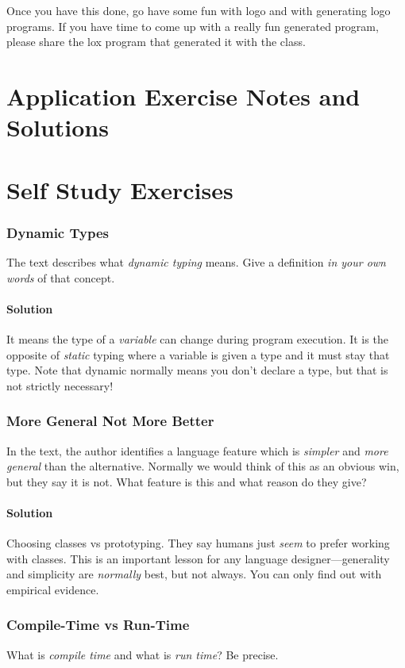 \documentclass[twoside=false, DIV=14]{scrartcl}
\begin{document}
Once you have this done, go have some fun with logo and with generating logo programs.  If you have time to come up with a really fun generated program, please share the lox program that generated it with the class.

\newpage
\part*{Application Exercise Notes and Solutions}

\newpage
\part*{Self Study Exercises}

\section*{Dynamic Types}
The text describes what \emph{dynamic typing} means. Give a definition \emph{in your own words} of that concept.

\subsection*{Solution}
It means the type of a \emph{variable} can change during program execution. It is the opposite of \emph{static} typing where a variable is given a type and it must stay that type. Note that dynamic normally means you don't declare a type, but that is not strictly necessary!

\section*{More General Not More Better}
In the text, the author identifies a language feature which is \emph{simpler} and \emph{more general} than the alternative. Normally we would think of this as an obvious win, but they say it is not. What feature is this and what reason do they give?

\subsection*{Solution}
Choosing classes vs prototyping. They say humans just \emph{seem} to prefer working with classes. This is an important lesson for any language designer—generality and simplicity are \emph{normally} best, but not always. You can only find out with empirical evidence.

\section*{Compile-Time vs Run-Time}
What is \emph{compile time} and what is \emph{run time}? Be precise.
\end{document}
